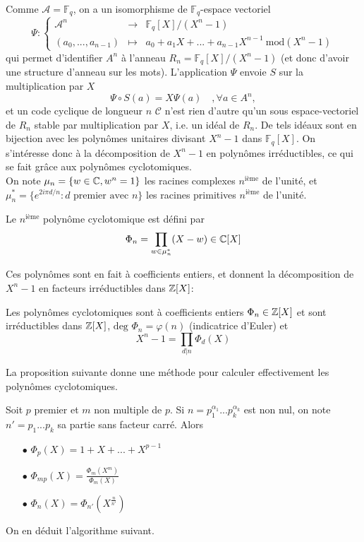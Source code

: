 Comme $\mathcal A=\mathbb F_q$, on a un isomorphisme de $\mathbb F_q$-espace vectoriel
\[\Psi :\left\{\begin{array}{lcl}\mathcal  A^n &\rightarrow & \mathbb F_q[X]/(X^n-1)\\
	(a_0,...,a_{n-1}) & \mapsto & a_0 + a_1 X +...+a_{n-1} X^{n-1}\ \text{mod}(X^n -1)\end{array}\right.\]
qui permet d'identifier $A^n$ à l'anneau $R_n = \mathbb F_q[X]/(X^n-1)$ (et donc d'avoir une structure d'anneau sur les mots). L'application $\Psi$ envoie $S$ sur la multiplication par $X$ 
\[\Psi\circ S(a)= X \Psi(a)\quad ,\forall a\in A^n,\]
et un code cyclique de longueur $n$ $\mathcal C$ n'est rien d'autre qu'un sous espace-vectoriel de $R_n$ stable par multiplication par $X$, i.e. un idéal de $R_n$. De tels idéaux sont en bijection avec les polynômes unitaires divisant $X^n-1$ dans $\mathbb F_q[X]$. On s'intéresse donc à la décomposition de $X^n-1$ en polynômes irréductibles, ce qui se fait grâce aux polynômes cyclotomiques.\\

On note $\mu_n = \{w\in \mathbb C , w^n =1\}$ les racines complexes $n^{\text{ième}}$ de l'unité, et $\mu_n^*=\{e^{2i\pi d/n} : d \text{ premier avec }n\}$ les racines primitives $n^{\text{ième}}$ de l'unité.\\

\begin{definition}
Le $n^{\text{ième}}$ polynôme cyclotomique est défini par 
\[\Phi_n = \prod_{w\in \mu_n^*} (X-w)\in \mathbb C[X]\] 
\end{definition}

Ces polynômes sont en fait à coefficients entiers, et donnent la décomposition de $X^n-1$ en facteurs irréductibles dans $\mathbb Z[X]$:
\begin{prop} Les polynômes cyclotomiques sont à coefficients entiers $\Phi_n\in \mathbb Z[X]$ et sont irréductibles dans $\mathbb Z[X]$, $\text{deg }\Phi_n =\varphi(n)$ (indicatrice d'Euler) et 
\[X^n-1 = \prod_{d|n} \Phi_d(X)\]
\end{prop}
 
La proposition suivante donne une méthode pour calculer effectivement les polynômes cyclotomiques.
\begin{prop} Soit $p$ premier et $m$ non multiple de $p$. Si $n=p_1^{\alpha_1}...p_k^{\alpha_k}$ est non nul, on note $n'=p_1...p_k$ sa partie sans facteur carré. Alors 
\begin{itemize}
\item[$\bullet$] $\Phi_p(X)=1+X+...+X^{p-1}$
\item[$\bullet$] $\Phi_{mp}(X)=\frac{\Phi_m(X^m)}{\Phi_m(X)}$
\item[$\bullet$] $\Phi_n(X)=\Phi_{n'}(X^{\frac{n}{n'}})$
\end{itemize}
\end{prop}
On en déduit l'algorithme suivant.\\

